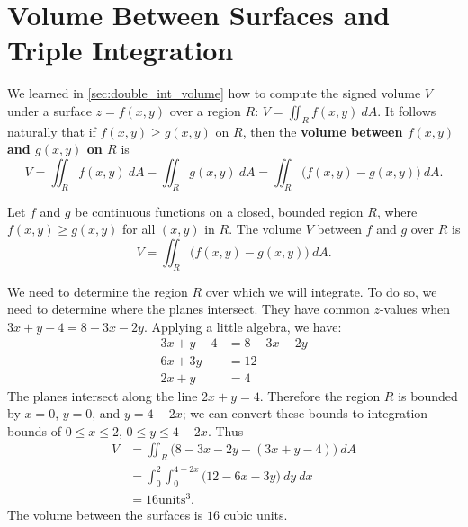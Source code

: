 \section{Volume Between Surfaces and Triple Integration}\label{sec:triple_int}

We learned in \autoref{sec:double_int_volume} how to compute the signed volume $V$ under a surface $z=f(x,y)$ over a region $R$: $V = \iint_R f(x,y)\ dA$. It follows naturally that if $f(x,y)\geq g(x,y)$ on $R$, then the \textbf{volume between $f(x,y)$ and $g(x,y)$ on $R$} is 
\[
V = \iint_R f(x,y)\ dA - \iint_R g(x,y)\ dA = \iint_R \big(f(x,y)-g(x,y)\big)\ dA.
\]

{Let $f$ and $g$ be continuous functions on a closed, bounded region $R$, where $f(x,y)\geq g(x,y)$ for all $(x,y)$ in $R$. The volume $V$ between $f$ and $g$ over $R$ is
\[V =\iint_R \big(f(x,y)-g(x,y)\big)\ dA.\]}

{We need to determine the region $R$ over which we will integrate. To do so, we need to determine where the planes intersect. They have common $z$-values when $3x+y-4=8-3x-2y$. Applying a little algebra, we have:
\begin{align*}
3x+y-4 &= 8-3x-2y\\
6x+3y &=12\\
2x+y &=4
\end{align*}
The planes intersect along the line $2x+y=4$. Therefore the region $R$ is bounded by $x=0$, $y=0$, and $y=4-2x$; we can convert these bounds to integration bounds of $0\leq x\leq 2$, $0\leq y\leq 4-2x$. Thus
\begin{align*}
V &= \iint_R \big(8-3x-2y-(3x+y-4)\big)\ dA \\
	&= \int_0^2\int_0^{4-2x} \big(12-6x-3y\big)\ dy\ dx\\
	&= 16\text{units}^3.
\end{align*}
The volume between the surfaces is $16$ cubic units.}

